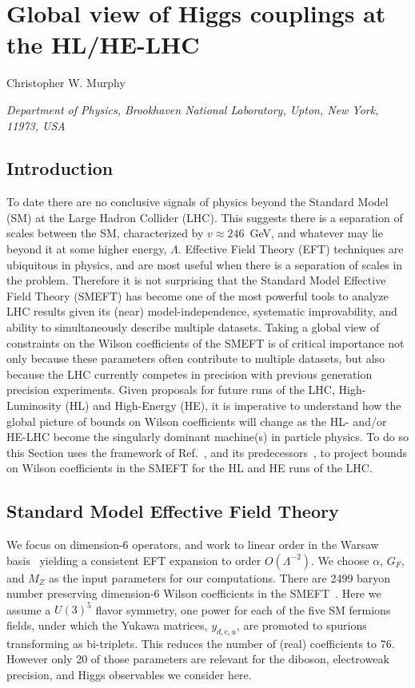 \documentclass[../report.tex]{subfiles}
\begin{document}
\section{Global view of Higgs couplings at the HL/HE-LHC}
\label{sec8}
\begin{center}
\bigskip\vspace{1cm}
{Christopher W. Murphy}
\centerline{{\it Department of Physics, Brookhaven National Laboratory, Upton, New York, 11973, USA}}
\end{center}

\subsection{Introduction}
\label{sec8:intro}
To date there are no conclusive signals of physics beyond the Standard Model (SM) at the Large Hadron Collider (LHC).
This suggests there is a separation of scales between the SM, characterized by $v \approx 246$~GeV, and whatever may lie beyond it at some higher energy, $\Lambda$.
Effective Field Theory (EFT) techniques are ubiquitous in physics, and are most useful when there is a separation of scales in the problem.
Therefore it is not surprising that the Standard Model Effective Field Theory (SMEFT) has become one of the most powerful tools to analyze LHC results given its (near) model-independence, systematic improvability, and ability to simultaneously describe multiple datasets.
Taking a global view of constraints on the Wilson coefficients of the SMEFT is of critical importance not only because these parameters often contribute to multiple datasets, but also because the LHC currently competes in precision with previous generation precision experiments.
Given proposals for future runs of the LHC, High-Luminosity (HL) and High-Energy (HE), it is imperative to understand how the global picture of bounds on Wilson coefficients will change as the HL- and/or HE-LHC become the singularly dominant machine(s) in particle physics.
To do so this Section uses the framework of Ref.~\cite{Ellis:2018gqa}, and its predecessors~\cite{Ellis:2014dva, Ellis:2014jta, Murphy:2017omb}, to project bounds on Wilson coefficients in the SMEFT for the HL and HE runs of the LHC.

\subsection{Standard Model Effective Field Theory}
We focus on dimension-6 operators, and work to linear order in the Warsaw basis~\cite{Grzadkowski:2010es} yielding a consistent EFT expansion to order $O(\Lambda^{-2})$. 
We choose $\alpha$, $G_F$, and $M_Z$ as the input parameters for our computations.
There are 2499 baryon number preserving dimension-6 Wilson coefficients in the SMEFT~\cite{Alonso:2013hga}.
Here we assume a $U(3)^5$ flavor symmetry, one power for each of the five SM fermions fields, under which the Yukawa matrices, $y_{d, e, u}$, are promoted to spurions transforming as bi-triplets.
This reduces the number of (real) coefficients to 76.
However only 20 of those parameters are relevant for the diboson, electroweak precision, and Higgs observables we consider here.
\end{document}
